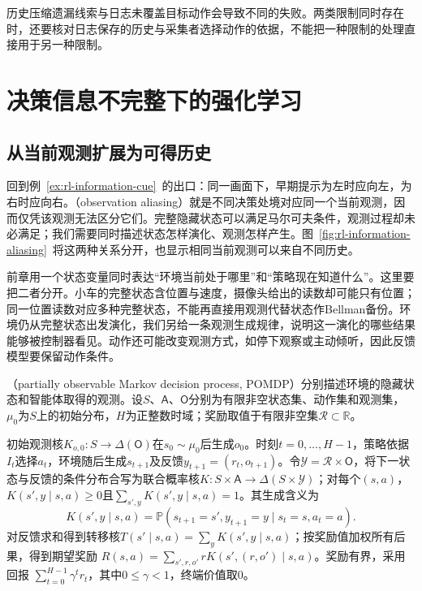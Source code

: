 历史压缩遗漏线索与日志未覆盖目标动作会导致不同的失败。两类限制同时存在时，还要核对日志保存的历史与采集者选择动作的依据，不能把一种限制的处理直接用于另一种限制。

\section{决策信息不完整下的强化学习}
\label{sec:rl-information-partial-observation}

\subsection{从当前观测扩展为可得历史}
\label{sec:rl-information-history-policy}

回到例~\ref{ex:rl-information-cue}~的出口：同一画面下，早期提示为左时应向左，为右时应向右。（observation aliasing）就是不同决策处境对应同一个当前观测，因而仅凭该观测无法区分它们。完整隐藏状态可以满足马尔可夫条件，观测过程却未必满足；我们需要同时描述状态怎样演化、观测怎样产生。图~\ref{fig:rl-information-aliasing}~将这两种关系分开，也显示相同当前观测可以来自不同历史。

前章用一个状态变量同时表达“环境当前处于哪里”和“策略现在知道什么”。这里要把二者分开。小车的完整状态含位置与速度，摄像头给出的读数却可能只有位置；同一位置读数对应多种完整状态，不能再直接用观测代替状态作Bellman备份。环境仍从完整状态出发演化，我们另给一条观测生成规律，说明这一演化的哪些结果能够被控制器看见。动作还可能改变观测方式，如停下观察或主动倾听，因此反馈模型要保留动作条件。

\begin{definition}[有限部分可观测马尔可夫决策过程]
  \label{def:rl-information-pomdp}
  （partially observable Markov decision process, POMDP）分别描述环境的隐藏状态和智能体取得的观测。设$S$、$\mathsf A$、$\mathsf O$分别为有限非空状态集、动作集和观测集，$\mu_0$为$S$上的初始分布，$H$为正整数时域；奖励取值于有限非空集$\mathcal R\subset\mathbb R$。

  初始观测核$K_{o,0}:S\to\Delta(\mathsf O)$在$s_0\sim\mu_0$后生成$o_0$。时刻$t=0,\ldots,H-1$，策略依据$I_t$选择$a_t$，环境随后生成$s_{t+1}$及反馈$y_{t+1}=(r_t,o_{t+1})$。令$\mathcal Y=\mathcal R\times\mathsf O$，将下一状态与反馈的条件分布合写为联合概率核$K:S\times\mathsf A\to\Delta(S\times\mathcal Y)$；对每个$(s,a)$，$K(s',y\mid s,a)\geq0$且$\sum_{s',y}K(s',y\mid s,a)=1$。其生成含义为
  \[
    K(s',y\mid s,a)
    =\mathbb P(s_{t+1}=s',y_{t+1}=y\mid s_t=s,a_t=a).
  \]
  对反馈求和得到转移核$T(s'\mid s,a)=\sum_yK(s',y\mid s,a)$；按奖励值加权所有后果，得到期望奖励
  $R(s,a)=\sum_{s',r,o'}rK(s',(r,o')\mid s,a)$。奖励有界，采用回报
  $\sum_{t=0}^{H-1}\gamma^t r_t$，其中$0\leq\gamma<1$，终端价值取0。
\end{definition}

